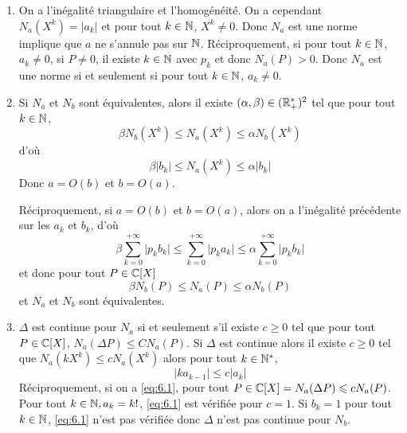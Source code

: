 \begin{solution}
	\phantom{}
	\begin{enumerate}
		\item On a l'inégalité triangulaire et l'homogénéité. On a cependant $N_{a}(X^{k})=\vert a_{k}\vert$ et pour tout $k\in\mathbb{N}$, $X^{k}\neq0$. Donc $N_{a}$ est une norme implique que $a$ ne s'annule pas sur $\mathbb{N}$. Réciproquement, si pour tout $k\in\mathbb{N}$, $a_{k}\neq0$, si $P\neq0$, il existe $k\in\mathbb{N}$ avec $p_{k}$ et donc $N_{a}(P)>0$. Donc $N_{a}$ est une norme si et seulement si pour tout $k\in\mathbb{N}$, $a_{k}\neq0$.
		
		\item Si $N_{a}$ et $N_{b}$ sont équivalentes, alors il existe $(\alpha,\beta)\in(\mathbb{R}_{+}^{*})^{2}$ tel que pour tout $k\in\mathbb{N}$,
		$$\beta N_{b}(X^{k})\leqslant N_{a}(X^{k})\leqslant\alpha N_{b}(X^{k})$$
		d'où
		$$\beta \vert b_{k}\vert\leqslant N_{a}(X^{k})\leqslant\alpha \vert b_{k}\vert$$
		Donc $a=O(b)$ et $b=O(a)$.

		Réciproquement, si $a=O(b)$ et $b=O(a)$, alors on a l'inégalité précédente sur les $a_{k}$ et $b_{k}$, d'où
		$$\beta\sum_{k=0}^{+\infty}\vert p_{k}b_{k}\vert\leqslant\sum_{k=0}^{+\infty}\vert p_{k}a_{k}\vert\leqslant\alpha\sum_{k=0}^{+\infty}\vert p_{k} b_{k}\vert$$
		et donc pour tout $P\in\mathbb{C}[X]$
		$$\beta N_{b}(P)\leqslant N_{a}(P)\leqslant\alpha N_{b}(P)$$
		et $N_{a}$ et $N_{b}$ sont équivalentes.

		\item $\Delta$ est continue pour $N_{a}$ si et seulement s'il existe $c\geqslant0$ tel que pour tout $P\in\mathbb{C}[X]$, $N_{a}(\Delta P)\leqslant CN_{a}(P)$. Si $\Delta$ est continue alors il existe $c\geqslant0$ tel que $N_{a}(kX^{k})\leqslant cN_{a}(X^{k})$ alors pour tout $k\in\mathbb{N}^{*}$,
		\begin{equation}
			\label{eq:6.1}
			\vert ka_{k-1}\vert\leqslant c\vert a_{k}\vert
		\end{equation}
		Réciproquement, si on a \eqref{eq:6.1}, pour tout $P\in\mathbb{C}[X]=N_{a}(\Delta P)\leqslant cN_{a}(P)$. Pour tout $k\in\mathbb{N},a_{k}=k!$, \eqref{eq:6.1} est vérifiée pour $c=1$. Si $b_{k}=1$ pour tout $k\in\mathbb{N}$, \eqref{eq:6.1} n'est pas vérifiée donc $\Delta$ n'est pas continue pour $N_{b}$.
	\end{enumerate}
\end{solution}

